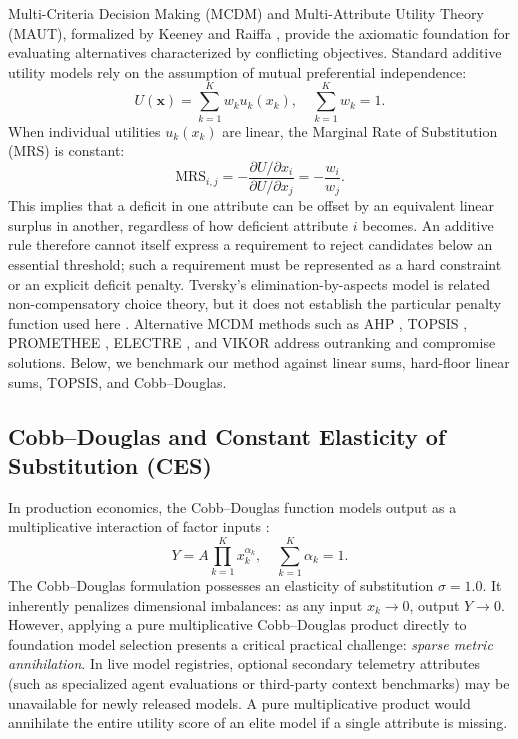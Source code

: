 \documentclass[pdflatex,sn-mathphys-num]{sn-jnl}
\theoremstyle{thmstyleone}
\theoremstyle{thmstylethree}
\begin{document}
Multi-Criteria Decision Making (MCDM) and Multi-Attribute Utility Theory (MAUT), formalized by Keeney and Raiffa \cite{keeney1993decisions}, provide the axiomatic foundation for evaluating alternatives characterized by conflicting objectives. Standard additive utility models rely on the assumption of mutual preferential independence:
\begin{equation}\label{eq:additive}
U(\mathbf{x}) = \sum_{k=1}^K w_k u_k(x_k), \quad \sum_{k=1}^K w_k = 1.
\end{equation}
When individual utilities $u_k(x_k)$ are linear, the Marginal Rate of Substitution (MRS) is constant:
\begin{equation}\label{eq:mrs}
\text{MRS}_{i,j} = -\frac{\partial U / \partial x_i}{\partial U / \partial x_j} = -\frac{w_i}{w_j}.
\end{equation}
This implies that a deficit in one attribute can be offset by an equivalent linear surplus in another, regardless of how deficient attribute $i$ becomes. An additive rule therefore cannot itself express a requirement to reject candidates below an essential threshold; such a requirement must be represented as a hard constraint or an explicit deficit penalty. Tversky's elimination-by-aspects model is related non-compensatory choice theory, but it does not establish the particular penalty function used here \cite{tversky1972elimination}. Alternative MCDM methods such as AHP \cite{saaty1980analytic}, TOPSIS \cite{hwang1981multiple}, PROMETHEE \cite{brans1985preference}, ELECTRE \cite{roy1968classement}, and VIKOR \cite{opricovic2004compromise} address outranking and compromise solutions. Below, we benchmark our method against linear sums, hard-floor linear sums, TOPSIS, and Cobb--Douglas.

\subsection{Cobb--Douglas and Constant Elasticity of Substitution (CES)}

In production economics, the Cobb--Douglas function models output as a multiplicative interaction of factor inputs \cite{cobb1928theory}:
\begin{equation}\label{eq:cobb_douglas}
Y = A \prod_{k=1}^K x_k^{\alpha_k}, \quad \sum_{k=1}^K \alpha_k = 1.
\end{equation}
The Cobb--Douglas formulation possesses an elasticity of substitution $\sigma = 1.0$. It inherently penalizes dimensional imbalances: as any input $x_k \to 0$, output $Y \to 0$. However, applying a pure multiplicative Cobb--Douglas product directly to foundation model selection presents a critical practical challenge: \emph{sparse metric annihilation}. In live model registries, optional secondary telemetry attributes (such as specialized agent evaluations or third-party context benchmarks) may be unavailable for newly released models. A pure multiplicative product would annihilate the entire utility score of an elite model if a single attribute is missing.
\end{document}

